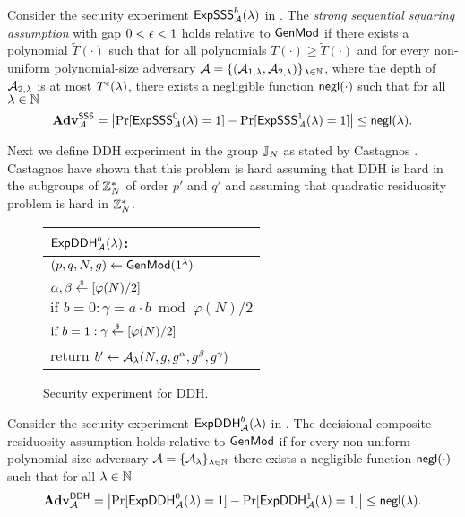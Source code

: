 \begin{definition}\label{def:sssa}
Consider the security experiment $\mathsf{ExpSSS}_{\mathcal{A}}^{b}(\lambda)$ in . The \emph{strong sequential squaring assumption} with gap $0< \epsilon <1$ holds relative to $\mathsf{GenMod}$ if there exists a polynomial $\tilde{T}(\cdot)$ such that for all polynomials $T(\cdot) \geq \tilde{T}(\cdot)$ and for every non-uniform polynomial-size adversary $\mathcal{A} = \{(\mathcal{A}_{1,\lambda}, \mathcal{A}_{2,\lambda})\}_{\lambda \in \mathbb{N}}$, where the depth of $\mathcal{A}_{2,\lambda}$ is at most $T^{\epsilon}(\lambda)$, there exists a negligible function $\mathsf{negl}(\cdot)$ such that for all $\lambda \in \mathbb{N}$ 
\[\mathbf{Adv}^\mathsf{SSS}_{\mathcal{A}} = \left| \Pr[\mathsf{ExpSSS}_{\mathcal{A}}^{0}(\lambda) = 1] - \Pr[\mathsf{ExpSSS}_{\mathcal{A}}^{1}(\lambda) = 1] \right| \leq \mathsf{negl}(\lambda).\]
\end{definition}

Next we define DDH experiment in the group $\mathbb{J}_N$ as stated by Castagnos \etal \cite{C:CouPetPoi16}. Castagnos \etal have shown that this problem is hard assuming that DDH is hard in the subgroups of $\mathbb{Z}_N^*$ of order $p'$ and $q'$ and assuming that quadratic residuosity problem is hard in $\mathbb{Z}_N^*$.  

\begin{figure}[h]
\begin{center}
\begin{tabular}{l}
$\mathsf{ExpDDH}_{\mathcal{A}}^{b}(\lambda)$: \\
\hline
$(p, q, N,g) \leftarrow \mathsf{GenMod}(1{^{\lambda}})$ \\
$\alpha, \beta \stackrel{{\scriptscriptstyle\$}}{\leftarrow} [\varphi(N)/2]$ \\
$\text{if } b = 0: \gamma = a\cdot b \bmod \varphi(N)/2$\\
$\text{if } b = 1: \gamma \stackrel{{\scriptscriptstyle\$}}{\leftarrow} [\varphi(N)/2]$ \\
return	$b' \leftarrow \mathcal{A}_{\lambda}(N,g,g^\alpha, g^\beta, g^\gamma)$
\end{tabular}
\end{center}
\caption{\label{fig:ddh}Security experiment for DDH.}
\end{figure}
 

\begin{definition}\label{thm:ddh}
Consider the security experiment $\mathsf{ExpDDH}_{\mathcal{A}}^{b}(\lambda)$ in .
The decisional composite residuosity assumption holds relative to $\mathsf{GenMod}$ if for every non-uniform polynomial-size adversary $\mathcal{A} = \{\mathcal{A}_{\lambda}\}_{\lambda \in \mathbb{N}}$ there exists a negligible function $\mathsf{negl}(\cdot)$ such that for all $\lambda \in \mathbb{N}$ 
\[\mathbf{Adv}^\mathsf{DDH}_{\mathcal{A}} = \left| \Pr[\mathsf{ExpDDH}_{\mathcal{A}}^{0}(\lambda) = 1] - \Pr[\mathsf{ExpDDH}_{\mathcal{A}}^{1}(\lambda) = 1] \right| \leq \mathsf{negl}(\lambda).\]
\end{definition} 

